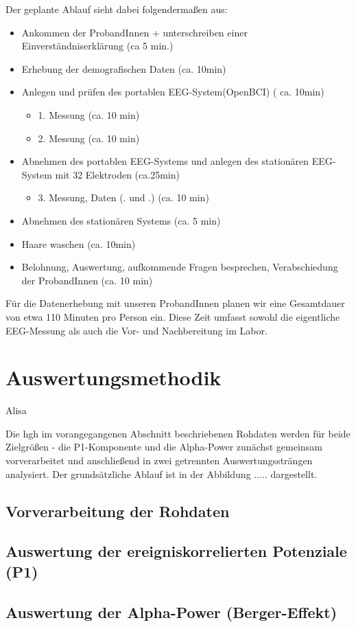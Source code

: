 Der geplante Ablauf sieht dabei folgendermaßen aus: 

    \begin{itemize}
\item Ankommen der ProbandInnen + unterschreiben einer Einverständniserklärung (ca 5 min.)
\item Erhebung der demografischen Daten (ca. 10min)
\item Anlegen und prüfen des portablen EEG-System(OpenBCI) ( ca. 10min)
\begin{itemize}
\item 1. Messung (ca. 10 min)
\item 2. Messung (ca. 10 min)
\end{itemize}
\item Abnehmen des portablen EEG-Systems und anlegen des stationären EEG-System mit 32 Elektroden (ca.25min)
\begin{itemize}
\item 3. Messung, Daten (. und .) (ca. 10 min)
\end{itemize}
\item Abnehmen des stationären Systems (ca. 5 min)
\item Haare waschen (ca.  10min)
\item Belohnung, Auswertung, aufkommende Fragen besprechen, Verabschiedung der ProbandInnen (ca. 10 min) 

\end{itemize}

Für die Datenerhebung mit unseren ProbandInnen planen wir eine Gesamtdauer von etwa 110 Minuten pro Person ein. Diese Zeit umfasst sowohl die eigentliche EEG-Messung als auch die Vor- und Nachbereitung im Labor.
\section{Auswertungsmethodik}
Alisa

Die hgh im vorangegangenen Abschnitt beschriebenen Rohdaten werden für beide Zielgrößen - die P1-Komponente und die Alpha-Power zunächst gemeinsam vorverarbeitet und anschließend in zwei getrennten Auswertungssträngen analysiert. Der grundsätzliche Ablauf ist in der Abbildung ..... dargestellt.

\subsection{Vorverarbeitung der Rohdaten}

\subsection{Auswertung der ereigniskorrelierten Potenziale (P1)}

\subsection{Auswertung der Alpha-Power (Berger-Effekt)}

